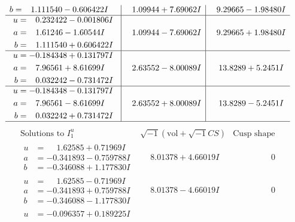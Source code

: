 \documentclass[1p]{elsarticle_modified}
\theoremstyle{definition}
\newcommand{\I}{\sqrt{-1}}
\begin{document}
$$\begin{array}{c|c|c}
\begin{aligned}
b &= \phantom{-}1.111540 - 0.606422 I\end{aligned}
 & \phantom{-}1.09944 + 7.69062 I & \phantom{-}9.29665 - 1.98480 I \\ \hline\begin{aligned}
u &= \phantom{-}0.232422 - 0.001806 I \\
a &= \phantom{-}1.61246 - 1.60544 I \\
b &= \phantom{-}1.111540 + 0.606422 I\end{aligned}
 & \phantom{-}1.09944 - 7.69062 I & \phantom{-}9.29665 + 1.98480 I \\ \hline\begin{aligned}
u &= -0.184348 + 0.131797 I \\
a &= \phantom{-}7.96561 + 8.61699 I \\
b &= \phantom{-}0.032242 - 0.731472 I\end{aligned}
 & \phantom{-}2.63552 - 8.00089 I & \phantom{-}13.8289 + 5.2451 I \\ \hline\begin{aligned}
u &= -0.184348 - 0.131797 I \\
a &= \phantom{-}7.96561 - 8.61699 I \\
b &= \phantom{-}0.032242 + 0.731472 I\end{aligned}
 & \phantom{-}2.63552 + 8.00089 I & \phantom{-}13.8289 - 5.2451 I\\
 \hline 
 \end{array}$$\newpage$$\begin{array}{c|c|c}  
\text{Solutions to }I^u_{1}& \I (\text{vol} + \sqrt{-1}CS) & \text{Cusp shape}\\
 \hline 
\begin{aligned}
u &= \phantom{-}1.62585 + 0.71969 I \\
a &= -0.341893 - 0.759788 I \\
b &= -0.346088 + 1.177830 I\end{aligned}
 & \phantom{-}8.01378 + 4.66019 I & \phantom{-0.000000 } 0 \\ \hline\begin{aligned}
u &= \phantom{-}1.62585 - 0.71969 I \\
a &= -0.341893 + 0.759788 I \\
b &= -0.346088 - 1.177830 I\end{aligned}
 & \phantom{-}8.01378 - 4.66019 I & \phantom{-0.000000 } 0 \\ \hline\begin{aligned}
u &= -0.096357 + 0.189225 I \\

\end{aligned}
\end{array}$$
\end{document}
